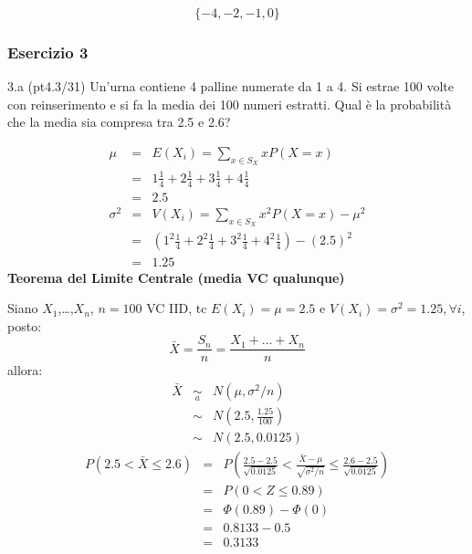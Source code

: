 \documentclass[
  10pt,
]{article}
\begin{document}
\[
\{-4,-2,-1,0\}
\]

\subsubsection{Esercizio 3}\label{esercizio-3}

3.a (pt\hspace{.1em}4.3/31) Un'urna contiene 4 palline numerate da 1 a 4.
Si estrae 100 volte con reinserimento e si fa la media dei 100 numeri
estratti. Qual è la probabilità che la media sia compresa tra 2.5 e 2.6?

\begin{sol}
\begin{eqnarray*} \mu &=& E(X_i) = \sum_{x\in S_X}x P(X=x)\\ 
 &=&  1  \frac { 1 }{ 4 }+ 2  \frac { 1 }{ 4 }+ 3  \frac { 1 }{ 4 }+ 4  \frac { 1 }{ 4 } \\ 
            &=& 2.5 \\ 
 \sigma^2 &=& V(X_i) = \sum_{x\in S_X}x^2 P(X=x)-\mu^2\\ 
 &=&\left(  1  ^2\frac { 1 }{ 4 }+ 2  ^2\frac { 1 }{ 4 }+ 3  ^2\frac { 1 }{ 4 }+ 4  ^2\frac { 1 }{ 4 } \right)-( 2.5 )^2\\ 
            &=& 1.25 
\end{eqnarray*}
\textbf{Teorema del Limite Centrale (media VC qualunque)}

Siano \(X_1\),\ldots,\(X_n\), \(n=100\) VC IID, tc \(E(X_i)=\mu=2.5\) e \(V(X_i)=\sigma^2=1.25,\forall i\), posto:
\[
      \bar X=\frac{S_n}n =\frac{X_1 + ... + X_n}n
      \]
allora:\begin{eqnarray*}
  \bar X & \mathop{\sim}\limits_{a}& N(\mu,\sigma^2/n) \\
     &\sim & N\left(2.5,\frac{1.25}{100}\right) \\
     &\sim & N(2.5,0.0125)
  \end{eqnarray*}\begin{eqnarray*}
   P( 2.5 < \bar X \leq  2.6 ) &=& P\left( \frac { 2.5  -  2.5 }{\sqrt{ 0.0125 }} < \frac { \bar X  -  \mu }{ \sqrt{\sigma^2/n} } \leq \frac { 2.6  -  2.5 }{\sqrt{ 0.0125 }}\right)  \\
              &=& P\left(  0  < Z \leq  0.89 \right) \\
              &=& \Phi( 0.89 )-\Phi( 0 )\\
              &=&  0.8133 - 0.5 \\ 
              &=&  0.3133 
   \end{eqnarray*}

\end{sol}
\end{document}
